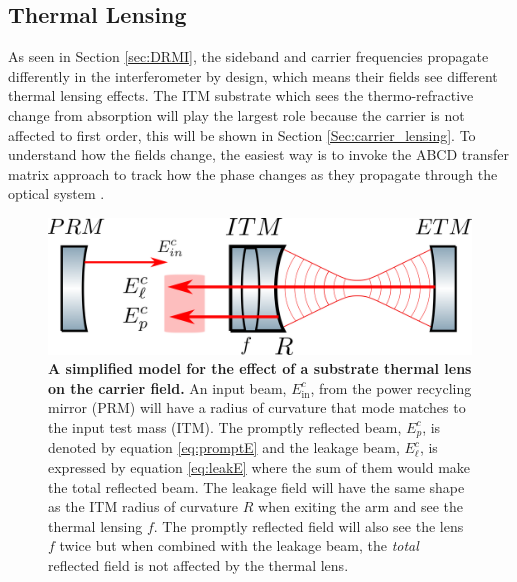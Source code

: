 	\subsection{Thermal Lensing}\label{Sec:TL_lensing}
	As seen in Section \ref{sec:DRMI}, the sideband and carrier frequencies propagate differently in the interferometer by design, which means their fields see different thermal lensing effects.  The ITM substrate which sees the thermo-refractive change from absorption will play the largest role because the carrier is not affected to first order, this will be shown in Section \ref{Sec:carrier_lensing}. To understand how the fields change, the easiest way is to invoke the ABCD transfer matrix approach to track how the phase changes as they propagate through the optical system \cite{Lawrence_TCS}.
	
	\begin{figure}[ht!]
		\centering
		\includegraphics[width=.7 \textwidth]{../Figures/ThermalLensFP.png}
		\caption[A simplified model for the effect of a substrate thermal lens on the carrier field.]  
		{\textbf{A simplified model for the effect of a substrate thermal lens on the carrier field.} An input beam, $E_{\text{in}}^{c}$, from the power recycling mirror (PRM) will have a radius of curvature that mode matches to the input test mass (ITM).  The promptly reflected beam, $E_{p}^{c}$, is denoted by equation \ref{eq:promptE} and the leakage beam, $E_{\ell}^{c}$, is expressed by equation \ref{eq:leakE} where the sum of them would make the total reflected beam.  The leakage field will have the same shape as the ITM radius of curvature $R$ when exiting the arm and see the thermal lensing $f$. The promptly reflected field will also see the lens $f$ twice but when combined with the leakage beam, the \textit{total} reflected field is not affected by the thermal lens.}
		\label{fig:ThermalLensFP}
	\end{figure}
